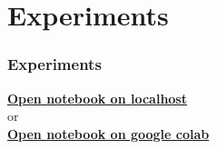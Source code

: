 \section{Experiments} %


\begin{frame}
    \frametitle{Experiments}
    \begin{center}
        \textbf{\href{http://localhost:8888/notebooks/ib_trees.ipynb}{Open notebook on localhost}}\\
        \small{or} \\
        \textbf{\href{https://colab.research.google.com/github/nielsrolf/InformationBottleneckTree/blob/master/ib_trees.ipynb}{Open notebook on google colab}}
    \end{center}

\end{frame}